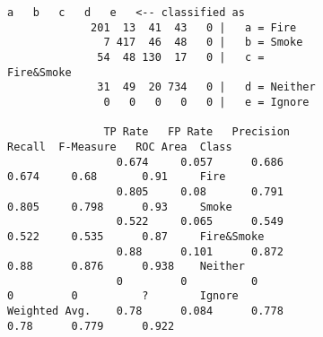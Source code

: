 \begin{figure}[h]
    
    \begin{subfigure}[b]{\textwidth}
    \caption{}
    \label{fig:cmatrix03}
    \begin{lstlisting}[language={}, basicstyle=\footnotesize, frame=none, basewidth=0.45em]
			   a   b   c   d   e   <-- classified as
			 201  13  41  43   0 |   a = Fire
			   7 417  46  48   0 |   b = Smoke
			  54  48 130  17   0 |   c = Fire&Smoke
			  31  49  20 734   0 |   d = Neither
			   0   0   0   0   0 |   e = Ignore

               TP Rate   FP Rate   Precision   Recall  F-Measure   ROC Area  Class
                 0.674     0.057      0.686     0.674     0.68       0.91     Fire
                 0.805     0.08       0.791     0.805     0.798      0.93     Smoke
                 0.522     0.065      0.549     0.522     0.535      0.87     Fire&Smoke
                 0.88      0.101      0.872     0.88      0.876      0.938    Neither
                 0         0          0         0         0          ?        Ignore
Weighted Avg.    0.78      0.084      0.778     0.78      0.779      0.922
    \end{lstlisting}
    \end{subfigure}
\end{figure}


